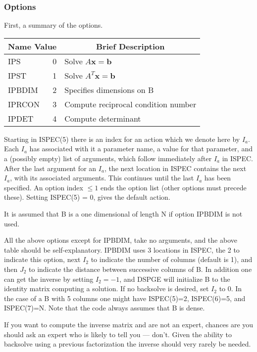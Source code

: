\documentclass[twoside]{MATH77}
\begin{document}
\subsubsection{Options}

First, a summary of the options.\vspace{2pt}

\begin{tabular}{|l@{}r|l|}\hline
  \multicolumn{2}{|c|}{\rule{0pt}{12pt}Name \hfill Value}&
  \multicolumn{1}{|c|}{Brief Description}
  \\[2pt]\hline\rule{0pt}{12pt}%
  IPS & 0 & Solve $A \mathbf{x} = \mathbf{b}$\\
  IPST & 1 & Solve $A^T \mathbf{x} = \mathbf{b}$\\
  IPBDIM & 2 & Specifies dimensions on B\\
  IPRCON & 3 & Compute reciprocal condition number\\
  IPDET & 4 & Compute determinant\\
\hline
\end{tabular}\vspace{5pt}

Starting in ISPEC(5) there is an index for an action which we denote
here by $I_a$.  Each $I_a$ has associated with it a parameter name, a
value for that parameter, and a (possibly empty) list of arguments,
which follow immediately after $I_a$ in ISPEC.  After the last
argument for an $I_a$, the next location in ISPEC contains the next
$I_a$, with its associated arguments.  This continues until the last
$I_a$ has been specified.  An option index $\leq 1$ ends the option
list (other options must precede these).  Setting ISPEC(5) = 0, gives
the default action.

It is assumed that B is a one dimensional of length N if option
IPBDIM is not used.

All the above options except for IPBDIM, take no arguments, and the
above table should be self-explanatory.  IPBDIM uses 3 locations in
ISPEC, the 2 to indicate this option, next $I_2$ to indicate the
number of columns (default is 1), and then $J_2$ to indicate the
distance between successive columns of B.  In addition one can get the
inverse by setting $I_2 = -1$, and DSPGE will initialize B to the
identity matrix computing a solution.  If no backsolve is desired, set
$I_2$ to 0.  In the case of a B with 5 columns one might have
ISPEC(5)=2, ISPEC(6)=5, and ISPEC(7)=N.  Note that the code always
assumes that B is dense.

If you want to compute the inverse matrix and are not an expert,
chances are you should ask an expert who is likely to tell you ---
don't.  Given the ability to backsolve using a previous factorization
the inverse should very rarely be needed.
\end{document}

